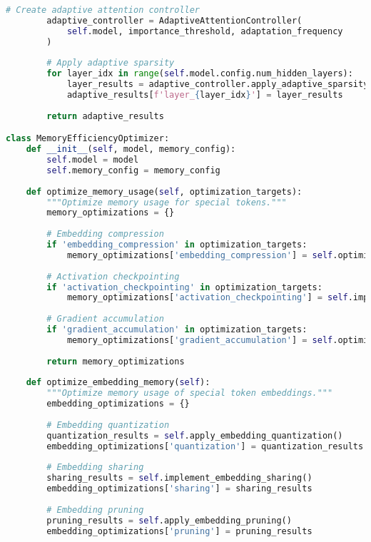 \begin{lstlisting}[language=Python, caption=Comprehensive computational efficiency optimization framework]
        # Create adaptive attention controller
        adaptive_controller = AdaptiveAttentionController(
            self.model, importance_threshold, adaptation_frequency
        )
        
        # Apply adaptive sparsity
        for layer_idx in range(self.model.config.num_hidden_layers):
            layer_results = adaptive_controller.apply_adaptive_sparsity(layer_idx)
            adaptive_results[f'layer_{layer_idx}'] = layer_results
        
        return adaptive_results

class MemoryEfficiencyOptimizer:
    def __init__(self, model, memory_config):
        self.model = model
        self.memory_config = memory_config
        
    def optimize_memory_usage(self, optimization_targets):
        """Optimize memory usage for special tokens."""
        memory_optimizations = {}
        
        # Embedding compression
        if 'embedding_compression' in optimization_targets:
            memory_optimizations['embedding_compression'] = self.optimize_embedding_memory()
        
        # Activation checkpointing
        if 'activation_checkpointing' in optimization_targets:
            memory_optimizations['activation_checkpointing'] = self.implement_activation_checkpointing()
        
        # Gradient accumulation
        if 'gradient_accumulation' in optimization_targets:
            memory_optimizations['gradient_accumulation'] = self.optimize_gradient_accumulation()
        
        return memory_optimizations
    
    def optimize_embedding_memory(self):
        """Optimize memory usage of special token embeddings."""
        embedding_optimizations = {}
        
        # Embedding quantization
        quantization_results = self.apply_embedding_quantization()
        embedding_optimizations['quantization'] = quantization_results
        
        # Embedding sharing
        sharing_results = self.implement_embedding_sharing()
        embedding_optimizations['sharing'] = sharing_results
        
        # Embedding pruning
        pruning_results = self.apply_embedding_pruning()
        embedding_optimizations['pruning'] = pruning_results
        

\end{lstlisting}
